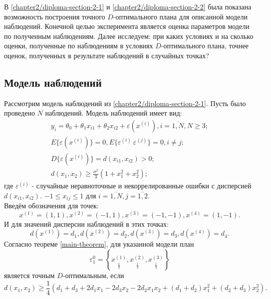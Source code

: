 В \ref{chapter2/diploma-section-2-1} и \ref{chapter2/diploma-section-2-2} была показана возможность построения точного $D$-оптимального плана для описанной модели наблюдений. Конечной целью эксперимента является оценка параметров модели по полученным наблюдениям. Далее исследуем: при каких условиях и на сколько оценки, полученные по наблюдениям в условиях $D$-оптимального плана, точнее оценок, полученных в результате наблюдений в случайных точках?

\subsection{Модель наблюдений}
Рассмотрим модель наблюдений из \ref{chapter2/diploma-section-2-1}.
Пусть было проведено $N$ наблюдений. Модель наблюдений имеет вид:
\begin{gather} \label{numerical-experiment:model:start}
y_i = \theta_0 + \theta_1 x_{i1} + \theta_2 x_{i2} + \varepsilon(x^{(i)}), i = \overline{1, N}, N \ge 3; \\
E\{ \varepsilon(x^{(i)}) \} = 0, E\{ \varepsilon^{(i)}\ \varepsilon^{(j)} \} = 0, i \ne j; \\
D\{ \varepsilon(x^{(i)}) \} = d(x_{i1}, x_{i2}) > 0; \\
d(x_1, x_2) \ge \frac{\sigma^2}{3}(1 + x_1^2 + x_2^2);
\label{numerical-experiment:model:end}
\end{gather}
где $\varepsilon^{(i)}$ - случайные неравноточные и некоррелированные ошибки с дисперсией $d(x_{i1}, x_{i2})$. $-1 \le x_{ij} \le 1$ для $i=\overline{1,N}, j=\overline{1, 2}$.\\
Введём обозначения для точек:
\begin{equation}\label{numerical-experiment:plan-points}
x^{(1)}=(1, 1), x^{(2)}=(-1, 1), x^{(3)}=(-1, -1), x^{(4)}=(1, -1).
\end{equation}
И для значений дисперсии наблюдений в этих точках:
\begin{equation}
d(x^{(1)}) = d_1, d(x^{(2)}) = d_2, d(x^{(3)}) = d_3, d(x^{(4)}) = d_4.
\end{equation}
Согласно теореме \ref{main-theorem}, для указанной модели план
\begin{equation} \label{numerical-expetiment:plan-1}
\varepsilon_1^{0} = \left \{ 
\underset{\frac 1 3} {x^{(1)}},
\underset{\frac 1 3} {x^{(2)}},
\underset{\frac 1 3} {x^{(3)}}
\right \}
\end{equation}
является точным $D$-оптимальным, если
\begin{equation}\label{numerical-experiment:d-eq}
d(x_1, x_2) \ge \frac 1 4 (d_1 + d_3 + 2 d_1 x_1 - 2 d_3 x_2 - 2d_2 x_1 x_2 + (d_1 + d_2)x_1^2 + (d_2 + d_3)x_2^2).
\end{equation}


